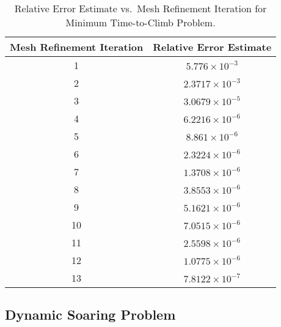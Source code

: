 \documentclass[10pt]{article}
\begin{document}
\begin{table}[h]
\centering
 \caption{Relative Error Estimate vs.~Mesh Refinement Iteration for Minimum Time-to-Climb Problem. \label{tab:minimumTimeToClimbMeshRefinement}}
\small
\begin{tabular}{|c|c|} \hline
{\bf Mesh Refinement Iteration} & {\bf Relative Error Estimate} \\\hline\hline
 1 & $5.776\times 10^{-3}$ \\\hline
 2 & $2.3717\times 10^{-3}$ \\\hline
 3 & $3.0679\times 10^{-5}$ \\\hline
 4 & $6.2216\times 10^{-6}$ \\\hline
 5 & $8.861\times 10^{-6}$ \\\hline
 6 & $2.3224\times 10^{-6}$ \\\hline
 7 & $1.3708\times 10^{-6}$ \\\hline
 8 & $3.8553\times 10^{-6}$ \\\hline
 9 & $5.1621\times 10^{-6}$ \\\hline
 10 & $7.0515\times 10^{-6}$ \\\hline
 11 & $2.5598\times 10^{-6}$ \\\hline
 12 & $1.0775\times 10^{-6}$ \\\hline
 13 & $7.8122\times 10^{-7}$ \\\hline
\end{tabular}
\end{table}

\clearpage

\subsection*{Dynamic Soaring Problem}
\end{document}
